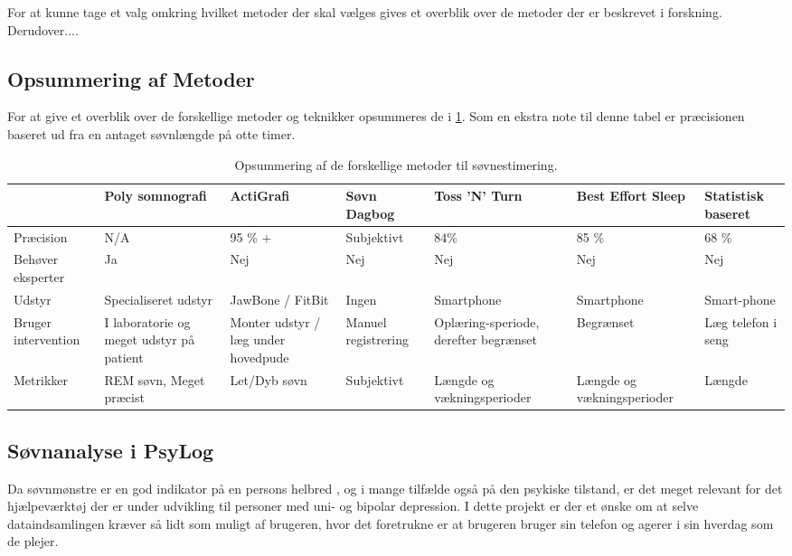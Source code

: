 For at kunne tage et valg omkring hvilket metoder der skal vælges gives et overblik over de metoder der er beskrevet i forskning. Derudover....


\subsection{Opsummering af Metoder}
For at give et overblik over de forskellige metoder og teknikker opsummeres de i \cref{tab:opsummeringMetoder}.
Som en ekstra note til denne tabel er præcisionen baseret ud fra en antaget søvnlængde på otte timer. 

\begin{table}[h]
\begin{tabular}{|p{1.5cm}|p{2cm}|p{2cm}|p{2cm}|p{2cm}|p{2cm}|p{1.5cm}|}
\hline & Poly somnografi & ActiGrafi & Søvn Dagbog & Toss 'N' Turn & Best Effort Sleep  & Statistisk baseret\\ 
\hline Præcision & N/A & 95 \% + & Subjektivt & 84\% & 85 \% & 68 \%\\ 
\hline Behøver eksperter & Ja & Nej & Nej & Nej & Nej & Nej \\ 
\hline Udstyr & Specialiseret udstyr & JawBone / FitBit & Ingen & Smartphone & Smartphone & Smart-phone \\ 
\hline Bruger intervention	& I laboratorie og meget udstyr på patient	& Monter udstyr / læg under hovedpude & Manuel registrering  & Oplæring-speriode, derefter begrænset & Begrænset & Læg telefon i seng \\ 
\hline Metrikker & REM søvn, Meget præcist	& Let/Dyb søvn & Subjektivt & Længde og vækningsperioder & Længde og vækningsperioder & Længde \\ 
\hline 
\end{tabular}
\caption{Opsummering af de forskellige metoder til søvnestimering.}
\label{tab:opsummeringMetoder}
\end{table}

\subsection{Søvnanalyse i PsyLog}
Da søvnmønstre er en god indikator på en persons helbred , og i mange tilfælde også på den psykiske tilstand, er det meget relevant for det hjælpeværktøj der er under udvikling til personer med uni- og bipolar depression.
I dette projekt er der et ønske om at selve dataindsamlingen kræver så lidt som muligt af brugeren, hvor det foretrukne er at brugeren bruger sin telefon og agerer i sin hverdag som de plejer.

